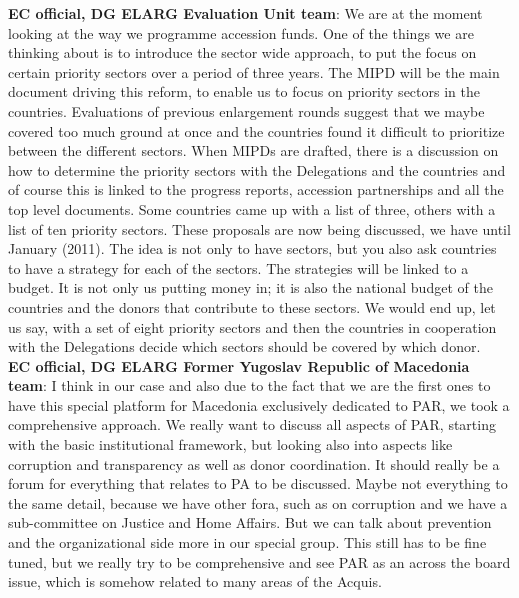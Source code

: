 \textbf{EC official, DG ELARG Evaluation Unit team}: We are at the moment looking at the way we programme accession funds. One of the things we are thinking about is to introduce the sector wide approach, to put the focus on certain priority sectors over a period of three years. The MIPD will be the main document driving this reform, to enable us to focus on priority sectors in the countries. Evaluations of previous enlargement rounds suggest that we maybe covered too much ground at once and the countries found it difficult to prioritize between the different sectors. When MIPDs are drafted, there is a discussion on how to determine the priority sectors with the Delegations and the countries and of course this is linked to the progress reports, accession partnerships and all the top level documents. Some countries came up with a list of three, others with a list of ten priority sectors. These proposals are now being discussed, we have until January (2011). The idea is not only to have sectors, but you also ask countries to have a strategy for each of the sectors. The strategies will be linked to a budget. It is not only us putting money in; it is also the national budget of the countries and the donors that contribute to these sectors. We would end up, let us say, with a set of eight priority sectors and then the countries in cooperation with the Delegations decide which sectors should be covered by which donor.\\
\textbf{EC official, DG ELARG Former Yugoslav Republic of Macedonia team}: I think in our case and also due to the fact that we are the first ones to have this special platform for Macedonia exclusively dedicated to PAR, we took a comprehensive approach. We really want to discuss all aspects of PAR, starting with the basic institutional framework, but looking also into aspects like corruption and transparency as well as donor coordination. It should really be a forum for everything that relates to PA to be discussed. Maybe not everything to the same detail, because we have other fora, such as on corruption and we have a sub-committee on Justice and Home Affairs. But we can talk about prevention and the organizational side more in our special group. This still has to be fine tuned, but we really try to be comprehensive and see PAR as an across the board issue, which is somehow related to many areas of the Acquis.\\
